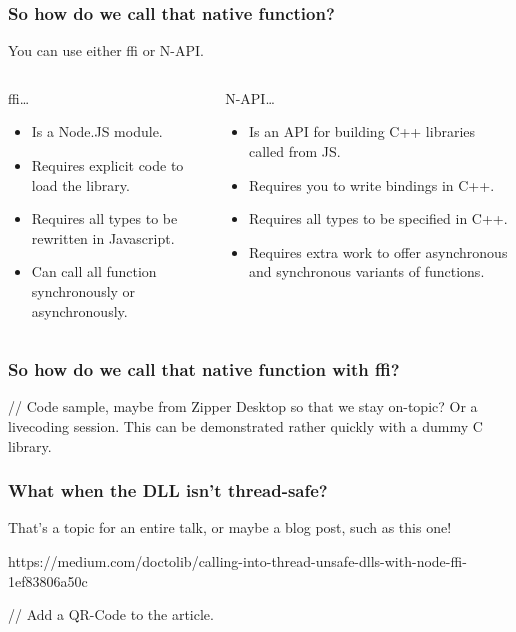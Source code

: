 \begin{frame}
	\frametitle{So how do we call that native function?}

	You can use either ffi or N-API. \vspace{1em}

	\begin{columns}[t]
		\begin{column}{0.5\textwidth}
			ffi…
			\begin{itemize}
				\item Is a Node.JS module.
				\item Requires explicit code to load the library.
				\item Requires all types to be rewritten in Javascript.
				\item Can call all function synchronously or asynchronously.
			\end{itemize}
		\end{column}
		\begin{column}{0.5\textwidth}
			N-API…
			\begin{itemize}
				\item Is an API for building C++ libraries called from JS.
				\item Requires you to write bindings in C++.
				\item Requires all types to be specified in C++.
				\item Requires extra work to offer asynchronous and synchronous
					variants of functions.
			\end{itemize}
		\end{column}
	\end{columns}
\end{frame}

\begin{frame}
	\frametitle{So how do we call that native function with ffi?}

	// Code sample, maybe from Zipper Desktop so that we stay on-topic? Or a
	livecoding session. This can be demonstrated rather quickly with a dummy C
	library.
\end{frame}

\begin{frame}
	\frametitle{What when the DLL isn’t thread-safe?}

	That’s a topic for an entire talk, or maybe a blog post, such as this one!

	https://medium.com/doctolib/calling-into-thread-unsafe-dlls-with-node-ffi-1ef83806a50c

	// Add a QR-Code to the article.
\end{frame}

